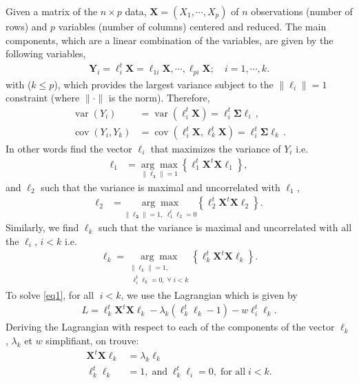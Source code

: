 Given a matrix of the $n\times p$ data, $\textbf{X}=(X_1,\cdots,X_p)$ of $n$ observations (number of rows) and $p$ variables (number of columns) centered and reduced. The main components, which are a linear combination of the variables, are given by the following variables,
\begin{align*}
\textbf{Y}_i=\ell^t_i\textbf{X}=\ell_{1i}\textbf{X},\cdots,\ell_{pi}\textbf{X};\quad i=1,\cdots,k.
\end{align*}
with ($k\leq p$), which provides the largest variance subject to the $\|\ell_i\|=1$ constraint (where $\|\cdot\|$ is the norm). 
Therefore,
\begin{align*}
\operatorname{var}\left(Y_{i}\right) &=\operatorname{var}\left(\ell_{i}^{t} \boldsymbol{X}\right)=\ell_{i}^{t} \boldsymbol{\Sigma} \ell_{i} \,,\\ 
\operatorname{cov}\left(Y_{i}, Y_{k}\right) &=\operatorname{cov}\left(\ell_{i}^{t} \boldsymbol{X}, \ell_{k}^{t} \boldsymbol{X}\right)=\ell_{i}^{t} \boldsymbol{\Sigma} \ell_{k}\, .
\end{align*}
In other words 
find the vector $\ell_{i}$ that maximizes the variance of $Y_i$ i.e.
\begin{align*}
\mathbf{\ell}_{1}&=\underset{\|\mathbf{\ell_1}\|=1}{\arg \max }\left\{\ell^t_1\mathbf{X}^{t} \mathbf{X} \ell_1\right\},
\end{align*}
and $\ell_2$ such that the variance is maximal and uncorrelated with $\ell_1$,   
\begin{align*}
\mathbf{\ell}_{2}& =\underset{\|\mathbf{\ell_2}\|=1,\;\ell_{1}^{t}\ell_{2} =0}{\arg \max }\left\{\ell^t_2\mathbf{X}^{t} \mathbf{X} \ell_2\right\}.
\end{align*}
Similarly, we find $\ell_k$ such that the variance is maximal and uncorrelated with all the $\ell_i$, $i<k$ i.e.
\begin{align}
\mathbf{\ell}_k=\underset{\substack{\|\ell_k\|=1,\\ \;\ell_{i}^{t}\ell_k=0,\;\forall\;i<k}}{\arg \max} \left\{\ell^t_k\mathbf{X}^t \mathbf{X} \ell_k\right\}.\label{eq1}
\end{align}
To solve \eqref{eq1}, for all $\;i<k$, we use the Lagrangian which is given by 
\begin{align*}
L=\ell^t_k\mathbf{X}^t \mathbf{X} \ell_k-\lambda_k(\ell^t_k\ell_k-1)-w\ell_{i}^{t}\ell_k.
\end{align*}
Deriving the Lagrangian with respect to each of the components of the vector $\ell_k$, $\lambda_k$ et $w$ simplifiant, on trouve: 
\begin{align}
\mathbf{X}^t \mathbf{X} \ell_k&=\lambda_k\ell_k\\
\ell^t_k\ell_k&=1,\; \text{and}\; \ell^t_k\ell_i=0,\;\text{for all}\; i<k.
\end{align}
